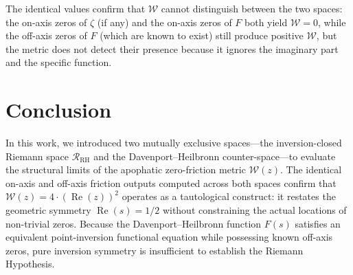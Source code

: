 \documentclass[11pt,a4paper]{article}
\numberwithin{table}{section}
\begin{document}
\begin{table}[h!]
\centering
\caption{Friction metric $\mathcal{W}(z)$ for Riemann and Davenport--Heilbronn spaces}
\label{tab:friction_results}
\end{table}

The identical values confirm that $\mathcal{W}$ cannot distinguish between the
two spaces: the on-axis zeros of $\zeta$ (if any) and the on-axis zeros of $F$
both yield $\mathcal{W}=0$, while the off-axis zeros of $F$ (which are known to
exist) still produce positive $\mathcal{W}$, but the metric does not detect
their presence because it ignores the imaginary part and the specific function.

\section{Conclusion}
In this work, we introduced two mutually exclusive spaces---the inversion-closed
Riemann space $\mathcal{R}_{\text{RH}}$ and the Davenport--Heilbronn
counter-space---to evaluate the structural limits of the apophatic zero-friction
metric $\mathcal{W}(z)$.
The identical on-axis and off-axis friction outputs computed across both spaces
confirm that $\mathcal{W}(z) = 4 \cdot (\operatorname{Re}(z))^2$ operates as a
tautological construct: it restates the geometric symmetry
$\operatorname{Re}(s) = 1/2$ without constraining the actual locations of
non-trivial zeros.
Because the Davenport--Heilbronn function $F(s)$ satisfies an equivalent
point-inversion functional equation while possessing known off-axis zeros,
pure inversion symmetry is insufficient to establish the Riemann Hypothesis.
\end{document}
